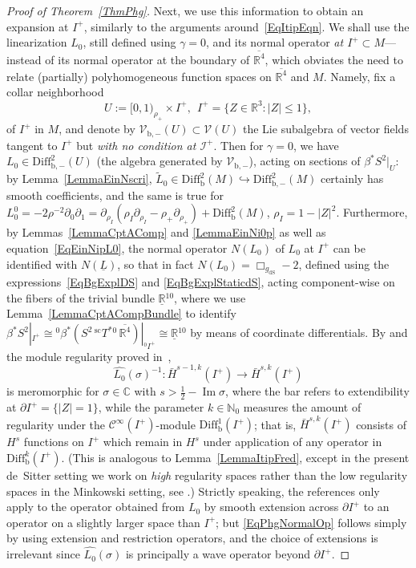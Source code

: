 \documentclass[reqno,11pt,letterpaper]{amsart}
\numberwithin{equation}{section}
\numberwithin{figure}{section}
\theoremstyle{definition}
\theoremstyle{remark}
\newcommand{\mc}{\mathcal}
\newcommand{\cC}{\mc C}
\newcommand{\cV}{\mc V}
\newcommand{\ms}{\mathscr}
\newcommand{\scri}{\ms I}
\newcommand{\C}{\mathbb{C}}
\newcommand{\N}{\mathbb{N}}
\newcommand{\R}{\mathbb{R}}
\renewcommand{\Im}{\operatorname{Im}}
\newcommand{\dS}{{\mathrm{dS}}}
\newcommand{\hra}{\hookrightarrow}
\newcommand{\ol}{\overline}
\newcommand{\pa}{\partial}
\newcommand{\ul}[1]{\underline{#1}{}}
\newcommand{\wh}{\widehat}
\newcommand{\wt}{\widetilde}
\newcommand{\bop}{{\mathrm{b}}}
\newcommand{\scl}{{\mathrm{sc}}}
\newcommand{\Diff}{\mathrm{Diff}}
\newcommand{\Diffb}{\Diff_\bop}
\newcommand{\Tsc}{{}^{\scl}T}
\newcommand{\half}{\tfrac{1}{2}}
\newcommand{\CI}{\cC^\infty}
\newcommand{\Hext}{\bar H}
\newcommand{\usref}[1]{{\upshape\ref{#1}}}
\begin{document}
\begin{proof}[Proof of Theorem~\usref{ThmPhg}]
  Next, we use this information to obtain an expansion at $I^+$, similarly to the arguments around~\eqref{EqItipEqn}. We shall use the linearization $L_0$, still defined using $\gamma=0$, and its normal operator \emph{at $I^+\subset M$}---instead of its normal operator at the boundary of $\ol{\R^4}$, which obviates the need to relate (partially) polyhomogeneous function spaces on $\ol{\R^4}$ and $M$. Namely, fix a collar neighborhood
  \[
    U:=[0,1)_{\rho_+}\times I^+,\ \ I^+=\{Z\in\R^3\colon|Z|\leq 1\},
  \]
  of $I^+$ in $M$, and denote by $\cV_{\bop,-}(U)\subset\cV(U)$ the Lie subalgebra of vector fields tangent to $I^+$ but \emph{with no condition at $\scri^+$}. Then for $\gamma=0$, we have $L_0\in\Diff_{\bop,-}^2(U)$ (the algebra generated by $\cV_{\bop,-}$), acting on sections of $\beta^*S^2|_U$: by Lemma~\ref{LemmaEinNscri}, $\wt L_0\in\Diffb^2(M)\hra\Diff_{\bop,-}^2(M)$ certainly has smooth coefficients, and the same is true for $L_0^0=-2\rho^{-2}\pa_0\pa_1=\pa_{\rho_I}(\rho_I\pa_{\rho_I}-\rho_+\pa_{\rho_+})+\Diffb^2(M)$, $\rho_I=1-|Z|^2$. Furthermore, by Lemmas~\ref{LemmaCptAComp} and \ref{LemmaEinNi0p} as well as equation~\eqref{EqEinNipL0}, the normal operator $N(L_0)$ of $L_0$ at $I^+$ can be identified with $N(\ul L)$, so that in fact $N(L_0)=\Box_{g_\dS}-2$, defined using the expressions~\eqref{EqBgExplDS} and \eqref{EqBgExplStaticdS}, acting component-wise on the fibers of the trivial bundle $\ul\R^{10}$, where we use Lemma~\ref{LemmaCptACompBundle} to identify $\beta^*S^2|_{I^+}\cong{}^0\beta^*(S^2\,\Tsc^*{}^0\,\ol{\R^4})|_{{}^0 I^+}\cong\ul\R^{10}$ by means of coordinate differentials. By \cite[\S4]{VasyMicroKerrdS} and the module regularity proved in~\cite{HaberVasyPropagation},
  \begin{equation}
  \label{EqPhgNormalOp}
    \wh{L_0}(\sigma)^{-1}\colon \Hext^{s-1,k}(I^+)\to\Hext^{s,k}(I^+)
  \end{equation}
  is meromorphic for $\sigma\in\C$ with $s>\half-\Im\sigma$, where the bar refers to extendibility at $\pa I^+=\{|Z|=1\}$, while the parameter $k\in\N_0$ measures the amount of regularity under the $\CI(I^+)$-module $\Diffb^1(I^+)$; that is, $\Hext^{s,k}(I^+)$ consists of $H^s$ functions on $I^+$ which remain in $H^s$ under application of any operator in $\Diffb^k(I^+)$. (This is analogous to Lemma~\ref{LemmaItipFred}, except in the present de~Sitter setting we work on \emph{high} regularity spaces rather than the low regularity spaces in the Minkowski setting, see \cite[\S5]{VasyMicroKerrdS}.) Strictly speaking, the references only apply to the operator obtained from $L_0$ by smooth extension across $\pa I^+$ to an operator on a slightly larger space than $I^+$; but \eqref{EqPhgNormalOp} follows simply by using extension and restriction operators, and the choice of extensions is irrelevant since $\wh{L_0}(\sigma)$ is principally a wave operator beyond $\pa I^+$.
  

\end{proof}
\end{document}
